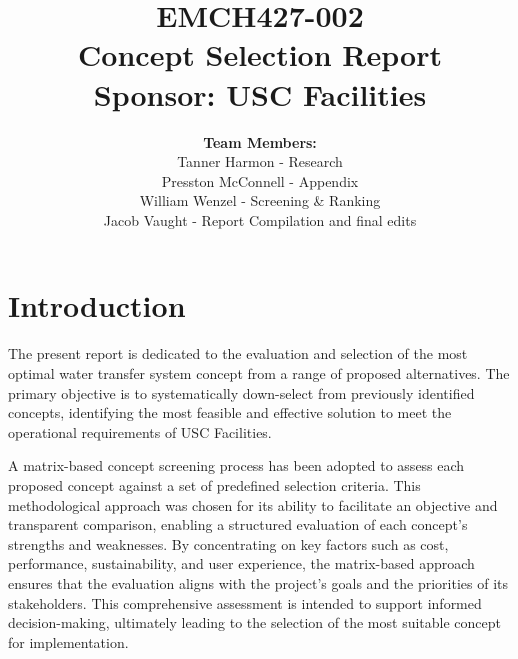 \documentclass[12pt]{article}
\begin{document}
\title{
    \vspace{2in}
    \textbf{EMCH427-002} \\[1ex]
    \textbf{Concept Selection Report} \\[1ex]
    \textbf{Sponsor: USC Facilities} \\[1ex]
    \vspace{2in}
}

\author{
    \textbf{Team Members:} \\[2ex]
    Tanner Harmon - Research  \\[1ex]
    Presston McConnell - Appendix  \\[1ex]
    William Wenzel - Screening \& Ranking  \\[1ex]
    Jacob Vaught - Report Compilation and final edits  \\[2ex]
}

\date{}

\maketitle
\thispagestyle{fancy}

\newpage
\section{Introduction}
\label{sec:introduction}

The present report is dedicated to the evaluation and selection of the most optimal water transfer system concept from a range of proposed alternatives. The primary objective is to systematically down-select from previously identified concepts, identifying the most feasible and effective solution to meet the operational requirements of USC Facilities.

A matrix-based concept screening process has been adopted to assess each proposed concept against a set of predefined selection criteria. This methodological approach was chosen for its ability to facilitate an objective and transparent comparison, enabling a structured evaluation of each concept's strengths and weaknesses. By concentrating on key factors such as cost, performance, sustainability, and user experience, the matrix-based approach ensures that the evaluation aligns with the project's goals and the priorities of its stakeholders. This comprehensive assessment is intended to support informed decision-making, ultimately leading to the selection of the most suitable concept for implementation.
\end{document}
